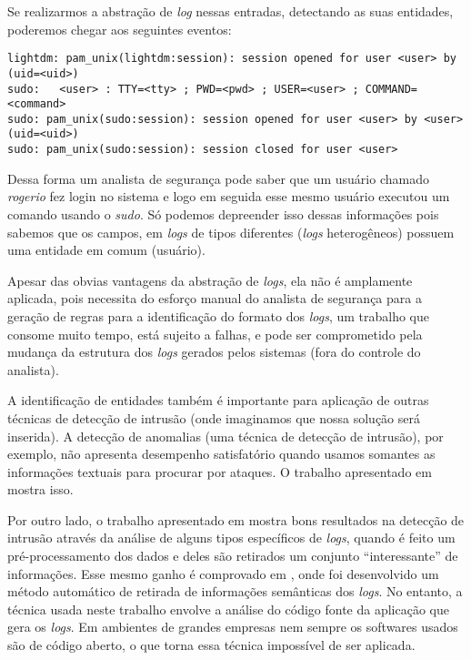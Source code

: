 \documentclass[
	12pt,				%
	openright,			%
	twoside,			%
	a4paper,			%
	english,			%
	spanish,			%
	brazil,				%
	]{abntex2}
\begin{document}
Se realizarmos a abstração de \emph{log} nessas entradas, detectando as suas entidades, poderemos chegar aos seguintes eventos:

{\small
\begin{verbatim}
lightdm: pam_unix(lightdm:session): session opened for user <user> by (uid=<uid>)
sudo:   <user> : TTY=<tty> ; PWD=<pwd> ; USER=<user> ; COMMAND=<command>
sudo: pam_unix(sudo:session): session opened for user <user> by <user>(uid=<uid>)
sudo: pam_unix(sudo:session): session closed for user <user>
\end{verbatim}
}

Dessa forma um analista de segurança pode saber que um usuário chamado \emph{rogerio} fez login no sistema e logo em seguida esse mesmo usuário executou um comando usando o \emph{sudo}. Só podemos depreender isso dessas informações pois sabemos que os campos, em \emph{logs} de tipos diferentes (\emph{logs} heterogêneos) possuem uma entidade em comum (usuário).

Apesar das obvias vantagens da abstração de \emph{logs}, ela não é amplamente aplicada, pois necessita do esforço manual do analista de segurança para a geração de regras para a identificação do formato dos \emph{logs}, um trabalho que consome muito tempo, está sujeito a falhas, e pode ser comprometido pela mudança da estrutura dos \emph{logs} gerados pelos sistemas (fora do controle do analista).

A identificação de entidades também é importante para aplicação de outras técnicas de detecção de intrusão (onde imaginamos que nossa solução será inserida). A detecção de anomalias (uma técnica de detecção de intrusão), por exemplo, não apresenta desempenho satisfatório quando usamos somantes as informações textuais para procurar por ataques. O trabalho apresentado em \cite{li2013automatic} mostra isso.

Por outro lado, o trabalho apresentado em \cite{yen2013beehive} mostra bons resultados na detecção de intrusão através da análise de alguns tipos específicos de \emph{logs}, quando é feito um pré-processamento dos dados e deles são retirados um conjunto ``interessante'' de informações. Esse mesmo ganho é comprovado em \cite{xu2009detecting}, onde foi desenvolvido um método automático de retirada de informações semânticas dos \emph{logs}. No entanto, a técnica usada neste trabalho envolve a análise do código fonte da aplicação que gera os \emph{logs}. Em ambientes de grandes empresas nem sempre os softwares usados são de código aberto, o que torna essa técnica impossível de ser aplicada.
\end{document}
